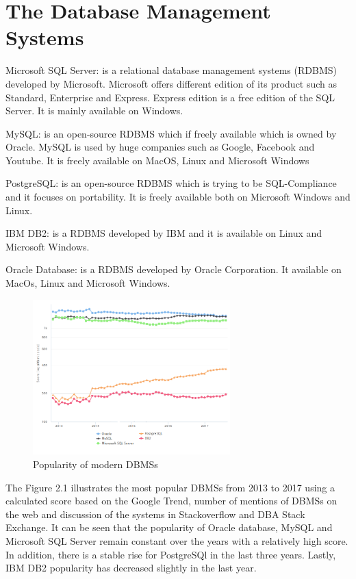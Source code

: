 \section{The Database Management Systems} 

Microsoft SQL Server: is a relational database management systems (RDBMS) developed by Microsoft. Microsoft offers different edition of its product such as Standard, Enterprise and Express. Express edition is a free edition of the SQL Server. It is mainly available on Windows. 

MySQL: is an open-source RDBMS which if freely available which is owned by Oracle. MySQL is used by huge companies such as Google, Facebook and Youtube. It is freely available on MacOS, Linux and Microsoft Windows 

PostgreSQL: is an open-source RDBMS which is trying to be SQL-Compliance and it focuses on portability.  It is freely available both on Microsoft Windows and Linux. 

IBM DB2: is a RDBMS developed by IBM and it is available on Linux and Microsoft Windows. 

Oracle Database: is a RDBMS developed by Oracle Corporation.  It available on MacOs, Linux and Microsoft Windows. 


 \begin{figure} 
      \centering
      \includegraphics[width=\textwidth,height=6cm]{Images/db_engines_chart}
      \caption{Popularity of modern DBMSs}
      \label{fig: Popularity of modern DBMSs}
    \end{figure}

The Figure 2.1 illustrates the most popular DBMSs from 2013 to 2017 using a calculated score based on the Google Trend, number of mentions of DBMSs on the web and discussion of the systems in Stackoverflow and DBA Stack Exchange. It can be seen that the popularity of Oracle database, MySQL and Microsoft SQL Server remain constant over the years with a relatively high score. In addition, there is a stable rise for PostgreSQl in the last three years. Lastly, IBM DB2 popularity has decreased slightly in the last year. 



